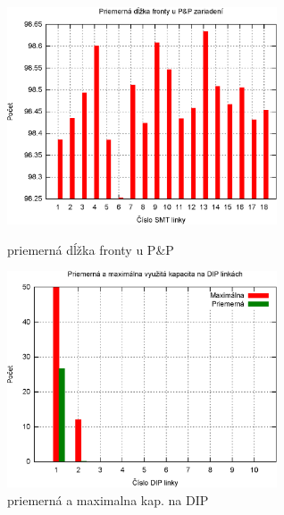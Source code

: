 \documentclass[12pt,a4paper,titlepage,final]{article}
\begin{document}
\begin{figure}[!ht]
  \centering
  \begin{minipage}{0.45\linewidth}
  \centering
  \includegraphics[width=8cm]{doc/4_hist3.eps}
  \caption{priemerná dĺžka fronty u P\&P}
  \end{minipage}
  \quad
  \begin{minipage}{0.45\linewidth}
    \centering
    \includegraphics[width=8cm]{doc/4_hist4.eps}
    \caption{priemerná a maximalna kap. na DIP}
  \end{minipage}
\end{figure}

\newpage
\end{document}
